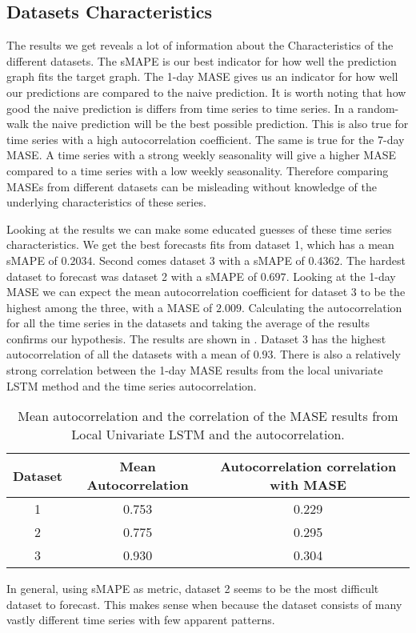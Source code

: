 
\subsection{Datasets Characteristics}
The results we get reveals a lot of information about the Characteristics of the different datasets.
The sMAPE is our best indicator for how well the prediction graph fits the target graph.
The 1-day MASE gives us an indicator for how well our predictions are compared to the naive
prediction. It is worth noting that how good the naive prediction is differs from time series
to time series. In a random-walk the naive prediction will be the best possible prediction.
This is also true for time series with a high autocorrelation coefficient.
The same is true for the 7-day MASE. A time series with a strong weekly seasonality will
give a higher MASE compared to a time series with a low weekly seasonality.
Therefore comparing MASEs from different datasets can be misleading without knowledge of
the underlying characteristics of these series.

Looking at the results we can make some educated guesses of these time series characteristics.
We get the best forecasts fits from dataset 1, which has a mean sMAPE of $0.2034$.
Second comes dataset 3 with a sMAPE of $0.4362$. The hardest dataset to forecast was dataset 2 with a
sMAPE of $0.697$. Looking at the 1-day MASE we can expect the mean autocorrelation coefficient for
dataset 3 to be the highest among the three, with a MASE of $2.009$.
Calculating the autocorrelation for all the time series in the datasets and
taking the average of the results confirms our hypothesis. The results are shown in .
Dataset 3 has the highest autocorrelation of all the datasets with a mean
of $0.93$. There is also a relatively strong correlation between the 1-day MASE results
from the local univariate LSTM method and the time series autocorrelation.

\begin{table}[htbp]
  \caption{Mean autocorrelation and the correlation of the MASE results from Local Univariate LSTM and the autocorrelation.}
  \centering
  \label{tab:datasets-autocorrelation}
  \begin{tabular}{|c|c|c|}\hline\hline
    Dataset & Mean Autocorrelation & Autocorrelation correlation with MASE \\\hline
    1       & 0.753                & 0.229                                 \\\hline
    2       & 0.775                & 0.295                                 \\\hline
    3       & 0.930                & 0.304                                 \\\hline
  \end{tabular}
\end{table}%


In general, using sMAPE as metric, dataset 2 seems to be the most difficult dataset to forecast.
This makes sense when because the dataset consists of many vastly different time series
with few apparent patterns.